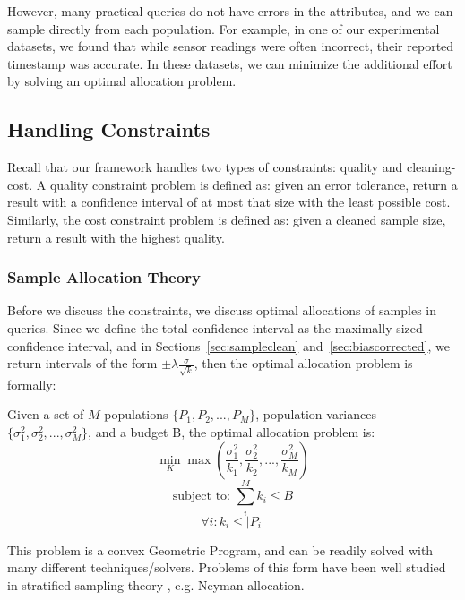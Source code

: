 However, many practical queries do not have errors in the \groupby attributes, and we can sample directly from each population.
For example, in one of our experimental datasets, we found that while sensor readings were often incorrect, their reported timestamp was accurate.
In these datasets, we can minimize the additional effort by solving an optimal allocation problem.

\subsection{Handling Constraints}\label{subsec:constraint}
Recall that our framework handles two types of constraints: quality and cleaning-cost.
A quality constraint problem is defined as: given an error tolerance, return a result with a confidence interval of at most that size with the least possible cost.
Similarly, the cost constraint problem is defined as: given a cleaned sample size, return a result with the highest quality.

\subsubsection{Sample Allocation Theory}
Before we discuss the constraints, we discuss optimal allocations of samples in \groupby queries. Since we define the total confidence interval as the maximally sized confidence interval,
and in Sections~\ref{sec:sampleclean} and~\ref{sec:biascorrected}, we return intervals of the form $\pm\lambda\frac{\sigma}{\sqrt{k}}$, then the optimal allocation problem is formally:
\begin{definition}
\label{def:allocation}
Given a set of $M$ populations $\{P_1,P_2,...,P_M\}$, population variances $\{\sigma_1^2,\sigma_2^2,...,\sigma_M^2\}$, and a budget B, the optimal allocation problem is:
\[ \min_K \max(\frac{\sigma_1^2}{k_1},\frac{\sigma_2^2}{k_2},...,\frac{\sigma_M^2}{k_M})\]
\vspace{-7pt}\[ \text{subject to: } \sum_i^M k_i \le B \]
\vspace{-7pt}\[ \forall i: k_i \le |P_i| \]
\end{definition}

This problem is a convex Geometric Program, and can be readily solved with many different techniques/solvers.
Problems of this form have been well studied in stratified sampling theory \cite{kalton1983introduction}, e.g. Neyman allocation.

